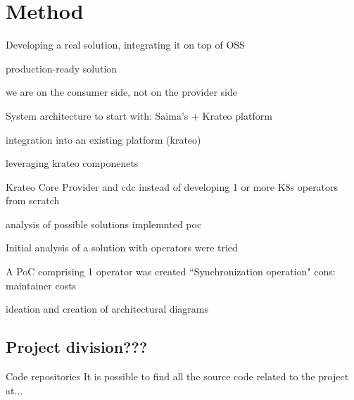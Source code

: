 \chapter{Method}
\label{cha:method}


Developing a real solution, integrating it on top of OSS

production-ready solution

we are on the consumer side, not on the provider side

System architecture to start with: Saima's + Krateo platform

integration into an existing platform (krateo)


leveraging krateo componenets

Krateo Core Provider and cdc instead of developing 1 or more K8s operators from scratch


analysis of possible solutions
implemnted poc 

Initial analysis of a solution with operators were tried

A PoC comprising 1 operator was created 
``Synchronization operation"
cons: maintainer costs



ideation and creation of architectural diagrams



\section{Project division???}
Code repositories
It is possible to find all the source code related to the project at...

\newpage
